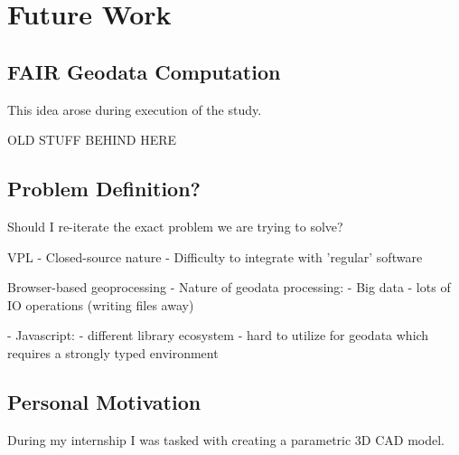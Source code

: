 \section{Future Work}
\label{chap:future-work}

\subsection{FAIR Geodata Computation}
This idea arose during execution of the study. 


\begin{note}
  OLD STUFF BEHIND HERE
\end{note}


\subsection{Problem Definition?}

Should I re-iterate the exact problem we are trying to solve? 

VPL
- Closed-source nature 
- Difficulty to integrate with 'regular' software

Browser-based geoprocessing
- Nature of geodata processing: 
  - Big data 
  - lots of IO operations (writing files away)

- Javascript:
  - different library ecosystem 
  - hard to utilize for geodata which requires a strongly typed environment 



\subsection{Personal Motivation}
During my internship I was tasked with creating a parametric 3D CAD model. 


